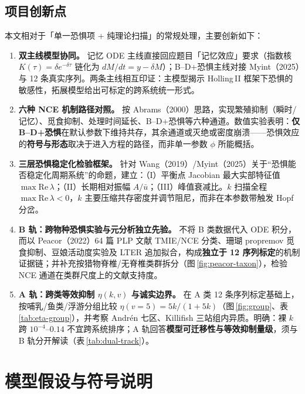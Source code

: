 \documentclass[12pt,a4paper]{ctexart}
\begin{document}
\subsection{项目创新点}

本文相对于「单一恐惧项 + 纯理论扫描」的常规处理，主要创新如下：

\begin{enumerate}[label=\textbf{创新\arabic*：},leftmargin=2.2em]
  \item \textbf{双主线模型协同。}
  记忆 ODE 主线直接回应题目「记忆效应」要求（指数核 $K(\tau)=\delta e^{-\delta\tau}$ 链化为 $dM/dt=y-\delta M$）；B--D+恐惧主线对接 Myint（2025）与 12 条真实序列。两条主线相互印证：主模型揭示 Holling\,II 框架下恐惧的敏感性，拓展模型给出可标定的跨系统统一形式。

  \item \textbf{六种 NCE 机制路径对照。}
  按 Abrams（2000）思路，实现繁殖抑制（瞬时/记忆）、觅食抑制、处理时间延长、B--D+恐惧等六种通道。数值实验表明：\textbf{仅 B--D+恐惧}在默认参数下维持共存，其余通道或灭绝或密度崩溃——恐惧效应的\textbf{符号与形态}取决于进入方程的路径，而非单一参数 $\phi$ 所能概括。

  \item \textbf{三层恐惧稳定化检验框架。}
  针对 Wang（2019）/Myint（2025）关于“恐惧能否稳定化周期系统”的命题，建立：（I）平衡点 Jacobian 最大实部特征值 $\max\mathrm{Re}\,\lambda$；（II）长期相对振幅 $A/\bar{u}$；（III）峰值衰减比。$k$ 扫描全程 $\max\mathrm{Re}\,\lambda<0$，$k$ 主要压缩共存密度并调节阻尼，而非在本参数带触发 Hopf 分岔。

  \item \textbf{B 轨：跨物种恐惧实验与元分析独立先验。}
  不将 B 类数据代入 ODE 积分，而以 Peacor（2022）64 篇 PLP 文献 TMIE/NCE 分类、珊瑚 propremov 觅食抑制、豆娘活动度实验及 LTER 追加拟合，构成\textbf{独立于 12 序列标定}的机制证据链；并补充按猎物脊椎/无脊椎类群拆分（图\,\ref{fig:peacor-taxon}），检验 NCE 通道在类群尺度上的文献支持度。

  \item \textbf{A 轨：跨类等效抑制 $\eta(k,v)$ 与诚实边界。}
  在 A 类 12 条序列标定基础上，按哺乳/鱼类/浮游分组比较 $\eta(v=5)=5k/(1+5k)$（图\,\ref{fig:group}、表\,\ref{tab:eta-group}），并考察 Andrén 七区、Killifish 三站组内异质。明确：裸 $k$ 跨 $10^{-4}$--$0.14$ 不宜跨系统排序；A 轨回答\textbf{模型可迁移性与等效抑制量级}，须与 B 轨分开解读（表\,\ref{tab:dual-track}）。
\end{enumerate}

\section{模型假设与符号说明}
\end{document}
